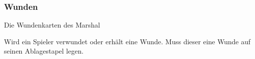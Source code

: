 
\subsubsection{Wunden}

\begin{description}

\item Die Wundenkarten des Marshal
\item Wird ein Spieler verwundet oder erhält eine Wunde. Muss dieser eine Wunde auf seinen Ablagestapel legen.

\end{description}
